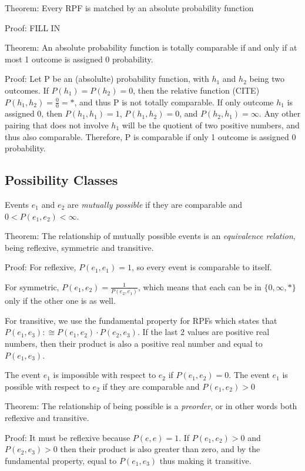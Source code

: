 \documentclass[twoside]{article}
\begin{document}
Theorem: Every RPF is matched by an absolute probability function

Proof: FILL IN

Theorem: An absolute probability function is totally comparable if and only if at most 1 outcome is assigned 0 probability.

Proof: Let P be an (absolulte) probability function, with \(h_1\) and \(h_2\) being two outcomes. If \(P(h_1) = P(h_2) = 0\), then the relative function (CITE) \(P(h_1, h_2) = \frac{0}{0} = \ast\), and thus P is not totally comparable. If only outcome \(h_1\) is assigned 0, then \(P(h_1, h_1) = 1\), \(P(h_1, h_2) = 0\), and \(P(h_2, h_1) = \infty\). Any other pairing that does not involve \(h_1\) will be the quotient of two positive numbers, and thus also comparable. Therefore, P is comparable if only 1 outcome is assigned 0 probability.

\subsection{Possibility Classes}

Events \(e_1\) and \(e_2\) are \textit{mutually possible} if they are comparable and \(0 < P(e_1, e_2) < \infty\).

Theorem: The relationship of mutually possible events is an \textit{equivalence relation}, being reflexive, symmetric and transitive.

Proof: For reflexive, \(P(e_1, e_1) = 1\), so every event is comparable to itself.

For symmetric, \(P(e_1, e_2) = \frac{1}{P(e_2, e_1)}\), which means that each can be in \(\{0, \infty, \ast\}\) only if the other one is as well.

For transitive, we use the fundamental property for RPFs which states that \(P(e_1, e_3) :\cong P(e_1, e_2) \cdot P(e_2, e_3)\). If the last 2 values are positive real numbers, then their product is also a positive real number and equal to \(P(e_1, e_3)\).

The event \(e_1\) is impossible with respect to \(e_2\) if \(P(e_1, e_2) = 0\). The event \(e_1\) is possible with respect to \(e_2\) if they are comparable and \(P(e_1, e_2) > 0\)

Theorem: The relationship of being possible is a \textit{preorder}, or in other words both reflexive and transitive.

Proof: It must be reflexive because \(P(e, e) = 1\). If \(P(e_1, e_2) > 0\) and \(P(e_2, e_3) > 0\) then their product is also greater than zero, and by the fundamental property, equal to \(P(e_1, e_3)\) thus making it transitive.
\end{document}
